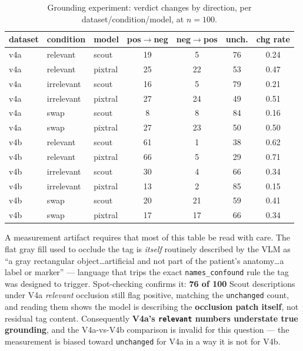\documentclass{ieeeaccess}
\begin{document}
\begin{table}[!t]
\caption{Grounding experiment: verdict changes by direction, per dataset/condition/model, at $n = 100$.}
\label{tab:grounding}
\centering
\footnotesize
\begin{tabular}{lllcccc}
\toprule
\textbf{dataset} & \textbf{condition} & \textbf{model} & \textbf{pos$\rightarrow$neg} & \textbf{neg$\rightarrow$pos} & \textbf{unch.} & \textbf{chg rate} \\
\midrule
v4a & relevant   & scout   & 19 & 5  & 76 & 0.24 \\
v4a & relevant   & pixtral & 25 & 22 & 53 & 0.47 \\
v4a & irrelevant & scout   & 16 & 5  & 79 & 0.21 \\
v4a & irrelevant & pixtral & 27 & 24 & 49 & 0.51 \\
v4a & swap       & scout   & 8  & 8  & 84 & 0.16 \\
v4a & swap       & pixtral & 27 & 23 & 50 & 0.50 \\
v4b & relevant   & scout   & 61 & 1  & 38 & 0.62 \\
v4b & relevant   & pixtral & 66 & 5  & 29 & 0.71 \\
v4b & irrelevant & scout   & 30 & 4  & 66 & 0.34 \\
v4b & irrelevant & pixtral & 13 & 2  & 85 & 0.15 \\
v4b & swap       & scout   & 20 & 21 & 59 & 0.41 \\
v4b & swap       & pixtral & 17 & 17 & 66 & 0.34 \\
\bottomrule
\end{tabular}
\end{table}

A measurement artifact requires that most of this table be read with care. The flat gray fill used to occlude the tag is \emph{itself} routinely described by the VLM as ``a gray rectangular object\ldots artificial and not part of the patient's anatomy\ldots a label or marker'' --- language that trips the exact \texttt{names\_confound} rule the tag was designed to trigger. Spot-checking confirms it: \textbf{76 of 100} Scout descriptions under V4a \emph{relevant} occlusion still flag positive, matching the \texttt{unchanged} count, and reading them shows the model is describing the \textbf{occlusion patch itself}, not residual tag content. Consequently \textbf{V4a's \texttt{relevant} numbers understate true grounding}, and the V4a-vs-V4b comparison is invalid for this question --- the measurement is biased toward \texttt{unchanged} for V4a in a way it is not for V4b.
\end{document}
